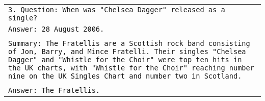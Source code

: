 \begin{table*}
\begin{tabular}{>{\raggedright\arraybackslash\tt}p{}<{}}
      \\
      3. Question: When was "Chelsea Dagger" released as a single?\\
      Answer: 28 August 2006.\\
      \\
      Summary: The Fratellis are a Scottish rock band consisting of Jon, Barry, and Mince Fratelli. Their singles "Chelsea Dagger" and "Whistle for the Choir" were top ten hits in the UK charts, with "Whistle for the Choir" reaching number nine on the UK Singles Chart and number two in Scotland. \\
      \\
      Answer: The Fratellis.\\
      \bottomrule
    \end{tabular}
    \label{tab:fewshot_summary_example}
\end{table*}
